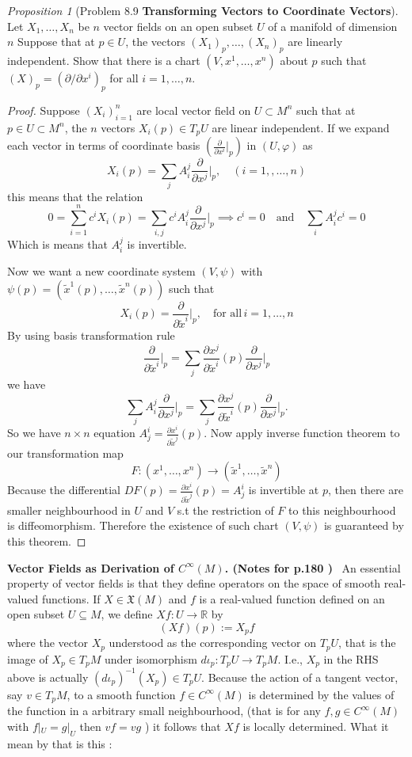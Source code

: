 \documentclass[a4paper]{article}
\theoremstyle{remark}
\newtheorem{prop}{Proposition}
\newcommand{\er}{\mathbb{R}} %
\newcommand{\subhim}{\subseteq} %
\newcommand{\CM}{C^{\infty}(M)} %
\newcommand{\VF}{\mathfrak{X}} %
\begin{document}
\begin{prop}[Problem 8.9 \cite{LWTu01} \textbf{Transforming Vectors to Coordinate Vectors}]
Let $X_1,\dots,X_n$ be  $n$ vector fields on an open subset $U$ of a manifold of dimension $n$ Suppose that at $p\in U$, the vectors $(X_1)_p,\dots,(X_n)_p$ are linearly independent. Show that there is a chart $(V,x^1,\dots,x^n)$ about $p$ such that $(X)_p=(\partial/\partial x^i)_p$ for all $i=1,\dots,n$.
\end{prop}
\begin{proof}
Suppose $(X_i)_{i=1}^n$ are local vector field on $U\subset M^n$ such that at $p\in U \subset M^n$, the $n$ vectors $X_i(p) \in T_pU$ are linear independent. If we expand each vector in terms of coordinate basis $(\frac{\partial}{\partial x^i}\big|_p)$ in $(U, \varphi)$ as 
$$
X_i(p) = \sum_jA_i^j \frac{\partial}{\partial x^j}\bigg|_p, \quad (i=1,,\dots,n)
$$
this means that the relation 
$$0=\sum _{i=1}^n c^i X_i(p) = \sum_{i,j}c^i A_i^j \frac{\partial}{\partial x^j}\bigg|_p \implies c^i=0 \quad \text{and} \quad \sum_iA^j_i c^i=0 $$ 
Which is means that $A^j_i$ is invertible. 

Now we want a new coordinate system $(V,\psi)$ with $\psi(p) = (\tilde{x}^1(p),\dots,\tilde{x}^n(p))$ such that
$$
X_i(p) = \frac{\partial}{\partial \tilde{x}^i} \bigg|_p, \quad \text{for all}\, i=1,\dots,n
$$
By using basis transformation rule 
$$\frac{\partial}{\partial \tilde{x}^i} \bigg|_p = \sum_j \frac{\partial x^j}{\partial \tilde{x}^i}(p) \frac{\partial}{\partial x^j} \bigg|_p$$
we have 
$$
\sum_j A_i^j \frac{\partial}{\partial x^j}\bigg|_p = \sum_j \frac{\partial x^j}{\partial \tilde{x}^i}(p) \frac{\partial}{\partial x^j} \bigg|_p.
$$
So we have $n\times n$ equation $A^i_j = \frac{\partial x^i}{\partial \tilde{x}^j}(p)$. Now apply inverse function theorem to our transformation map
$$
F : (x^1,\dots,x^n) \rightarrow (\tilde{x}^1,\dots,\tilde{x}^n)
$$
Because the differential $DF(p) =\frac{\partial x^i}{\partial \tilde{x}^j}(p) =A^i_j  $ is invertible at $p$, then there are smaller neighbourhood in $U$ and $V$ s.t the restriction of $F$ to this neighbourhood is diffeomorphism. Therefore the existence of such chart $(V,\psi)$ is guaranteed by this theorem. 
\end{proof}

\textbf{Vector Fields as Derivation of $\CM$. (Notes for p.180 \cite{LeeSM}) } \, An essential property of vector fields is that they define operators on the space of smooth real-valued functions. If $X \in \VF(M)$ and $f$ is a real-valued function defined on an open subset $U \subhim M$, we define $Xf : U \to \er$ by
$$
(Xf)(p) := X_pf
$$
where the vector $X_p$ understood as the corresponding vector on $T_pU$, that is the image of $X_p \in T_pM$ under isomorphism $d\iota_p : T_pU \to T_pM$. I.e., $X_p$ in the RHS above is actually $(d\iota_p)^{-1}(X_p) \in T_pU$. Because the action of a tangent vector, say $v\in T_pM$, to a smooth function $f \in \CM$ is determined by the values of the function in a arbitrary small neighbourhood, (that is for any $f,g \in \CM$ with $f|_U=g|_U$ then $vf = vg$ ) it follows that $Xf$ is locally determined. What it mean by that is this :
\end{document}

